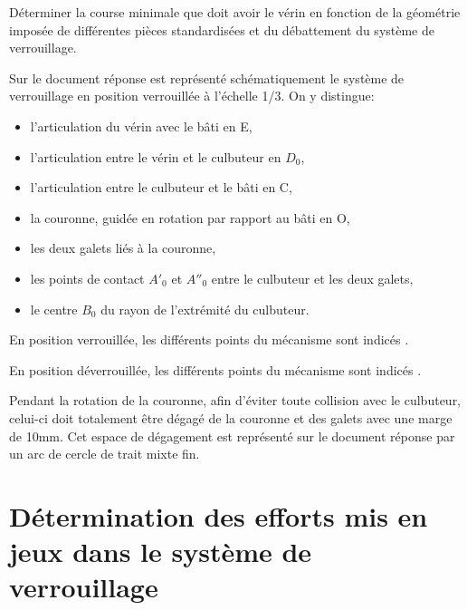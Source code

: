 Déterminer la course minimale que doit avoir le vérin en fonction de la géométrie imposée de différentes pièces standardisées et du débattement du système de verrouillage.

Sur le document réponse est représenté schématiquement le système de verrouillage en position verrouillée à l'échelle 1/3. On y distingue:
\begin{itemize}
 \item l'articulation du vérin avec le bâti en E,
 \item l'articulation entre le vérin et le culbuteur en $D_0$,
 \item l'articulation entre le culbuteur et le bâti en C,
 \item la couronne, guidée en rotation par rapport au bâti en O,
 \item les deux galets liés à la couronne,
 \item les points de contact $A'_0$ et $A''_0$ entre le culbuteur et les deux galets,
 \item le centre $B_0$ du rayon de l'extrémité du culbuteur.
\end{itemize}

En position verrouillée, les différents points du mécanisme sont indicés  \fg.

En position déverrouillée, les différents points du mécanisme sont indicés  \fg.

Pendant la rotation de la couronne, afin d'éviter toute collision avec le culbuteur, celui-ci doit totalement être dégagé de la couronne et des galets avec une marge de 10mm. Cet espace de dégagement est représenté sur le document réponse par un arc de cercle de trait mixte fin.



\section{Détermination des efforts mis en jeux dans le système de verrouillage}

